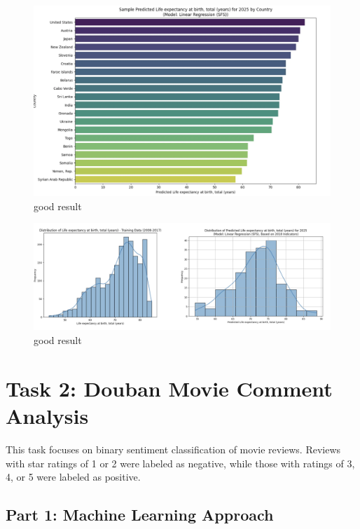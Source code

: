 \documentclass{article}
\begin{document}
\begin{figure}[h]
    \centering
    \includegraphics[width=0.8\columnwidth]{./pic/T1.bonus.1.png} %
    \caption{good result}
    \label{fig:correlation_heatmap3}
\end{figure}

\begin{figure}[h]
    \centering
    \includegraphics[width=0.8\columnwidth]{./pic/T1.bonus.2.png} %
    \caption{good result}
    \label{fig:correlation_heatmap4}
\end{figure}


\section{Task 2: Douban Movie Comment Analysis}
\label{sec:task2}

This task focuses on binary sentiment classification of movie reviews. Reviews with star ratings 
of 1 or 2 were labeled as negative, while those with ratings of 3, 4, or 5 were labeled as positive.

\subsection{Part 1: Machine Learning Approach}
\label{ssec:ml_approach}
\end{document}
